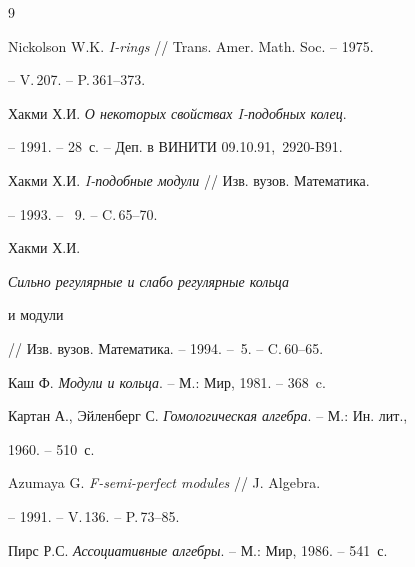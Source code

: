 \begin{thebibliography}{9}







Nickolson W.K. {\em I-rings} // Trans. Amer. Math. Soc. -- 1975.


-- V.\,207. -- P.\,361--373.




Хакми Х.И. {\em О некоторых свойствах I-подобных колец}.


-- 1991. -- 28~с. -- Деп. в ВИНИТИ 09.10.91, \No\,2920-B91.




Хакми Х.И. {\em I-подобные модули} // Изв. вузов. Математика.


-- 1993. -- \No\, 9. -- C.\,65--70.




Хакми Х.И. {\em Сильно регулярные и слабо регулярные кольца


и модули} // Изв. вузов. Математика. -- 1994. -- \No\,5. -- C.\,60--65.




Каш Ф. {\em Модули и кольца}. -- М.: Мир, 1981. -- 368~c.




Картан А., Эйленберг С. {\em Гомологическая алгебра}. -- М.: Ин. лит.,


1960. -- 510~с.




Azumaya G. {\em F-semi-perfect modules} // J. Algebra.


-- 1991. -- V.\,136. -- P.\,73--85.




Пирс Р.С. {\em Ассоциативные алгебры}. -- М.: Мир, 1986. -- 541~с.





\end{thebibliography}





\vskip 2cm

















